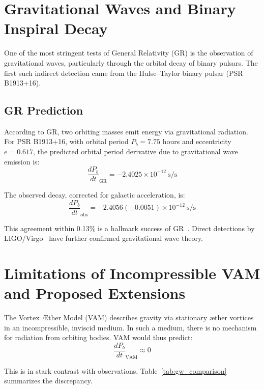 \section{Gravitational Waves and Binary Inspiral Decay}

One of the most stringent tests of General Relativity (GR) is the observation of gravitational waves, particularly through the orbital decay of binary pulsars. The first such indirect detection came from the Hulse--Taylor binary pulsar (PSR B1913+16).

\subsection*{GR Prediction}

According to GR, two orbiting masses emit energy via gravitational radiation. For PSR B1913+16, with orbital period $P_b = 7.75$ hours and eccentricity $e = 0.617$, the predicted orbital period derivative due to gravitational wave emission is:
\begin{equation}
\frac{dP_b}{dt}_\text{GR} = -2.4025\times10^{-12} \ \text{s/s}
\end{equation}

The observed decay, corrected for galactic acceleration, is:
\begin{equation}
\frac{dP_b}{dt}_\text{obs} = -2.4056(\pm 0.0051)\times10^{-12} \ \text{s/s}
\end{equation}

This agreement within 0.13\% is a hallmark success of GR~\cite{weisberg2016}. Direct detections by LIGO/Virgo~\cite{abbott2016} have further confirmed gravitational wave theory.

\section{Limitations of Incompressible VAM and Proposed Extensions}

The Vortex Æther Model (VAM) describes gravity via stationary æther vortices in an incompressible, inviscid medium. In such a medium, there is no mechanism for radiation from orbiting bodies. VAM would thus predict:
\begin{equation}
\frac{dP_b}{dt}_\text{VAM} \approx 0
\end{equation}

This is in stark contrast with observations. Table~\ref{tab:gw_comparison} summarizes the discrepancy.

